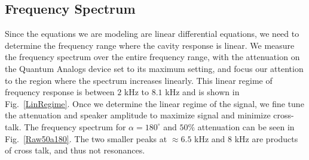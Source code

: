 \documentclass[12pt]{article}
\renewcommand{\deg}{^\circ} %
\newcommand{\figref}[1]{Fig.\ \ref{#1}}
\begin{document}
	\subsection{Frequency Spectrum}
	
	Since the equations we are modeling are linear differential equations, we need to determine the frequency range where the cavity response is linear. We measure the frequency spectrum over the entire frequency range, with the attenuation on the Quantum Analogs device set to its maximum setting, and focus our attention to the region where the spectrum increases linearly. This linear regime of frequency response is between $2$ kHz to $8.1$ kHz and is shown in \figref{LinRegime}. Once we determine the linear regime of the signal, we fine tune the attenuation and speaker amplitude to maximize signal and minimize cross-talk. The frequency spectrum for $\alpha = 180\deg$ and $50\%$ attenuation can be seen in \figref{Raw50a180}. The two smaller peaks at $\approx 6.5$ kHz and $8$ kHz are products of cross talk, and thus not resonances.
	
\end{document}
